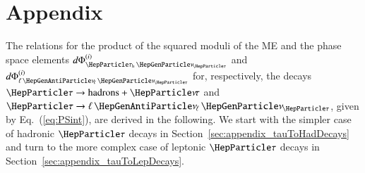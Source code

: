 \section{Appendix}
\label{sec:appendix}

The relations for the product of the squared moduli of the ME and the phase space elements
$d\Phi^{(i)}_{\tauhnu}$ and $d\Phi^{(i)}_{\ellnunu}$ for,
respectively, the decays $\Pgt \to \textrm{hadrons} + \Pnut$ and $\Pgt \to \ellnunu$, given by Eq.~(\ref{eq:PSint}),
are derived in the following.
We start with the simpler case of hadronic $\Pgt$ decays in Section~\ref{sec:appendix_tauToHadDecays} and turn to the more complex case of leptonic $\Pgt$ decays in Section~\ref{sec:appendix_tauToLepDecays}.